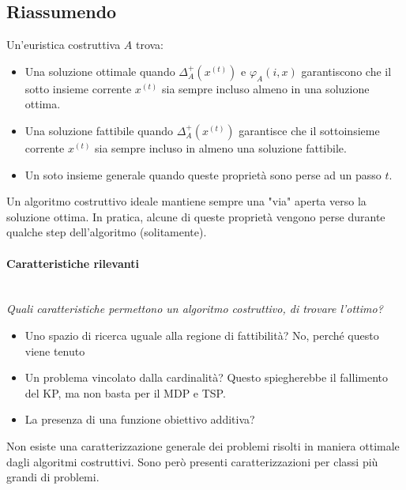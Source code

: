 \documentclass{article}
\begin{document}
\subsection{Riassumendo}
Un'euristica costruttiva $A$ trova:
\begin{itemize}
    \item Una soluzione ottimale quando $\Delta_A^+(x^{(t)})$ e $\varphi_A(i,x)$ garantiscono
          che il sotto insieme corrente $x^{(t)}$ sia sempre incluso almeno in una soluzione ottima.
    \item Una soluzione fattibile quando $\Delta_A^+(x^{(t)})$ garantisce che il sottoinsieme
          corrente $x^{(t)}$ sia sempre incluso in almeno una soluzione fattibile.
    \item Un soto insieme generale quando queste proprietà sono perse ad un passo $t$.
\end{itemize}
Un algoritmo costruttivo ideale mantiene sempre una "via" aperta verso la soluzione
ottima. In pratica, alcune di queste proprietà vengono perse durante qualche
step dell'algoritmo (solitamente).
\paragraph{Caratteristiche rilevanti}\mbox{}\\
\textit{Quali caratteristiche permettono un algoritmo costruttivo, di trovare l'ottimo?}
\begin{itemize}
    \item Uno spazio di ricerca uguale alla regione di fattibilità? No, perché questo viene tenuto
    \item Un problema vincolato dalla cardinalità? Questo spiegherebbe il fallimento del KP,
          ma non basta per il MDP e TSP.
    \item La presenza di una funzione obiettivo additiva?
\end{itemize}
Non esiste una caratterizzazione generale dei problemi risolti in maniera ottimale dagli algoritmi
costruttivi. Sono però presenti caratterizzazioni per classi più grandi di problemi.
\end{document}
